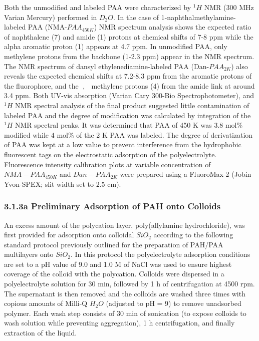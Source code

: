 \documentclass[journal=mamobx,manuscript=article]{achemso}
\begin{document}
Both the unmodified and labeled PAA were characterized by $^{1}H$ NMR (300 MHz Varian Mercury) performed in $D_2O$.  In the case of 1-naphthalmethylamine-labeled PAA (NMA-$PAA_{450K}$) NMR spectrum analysis shows the expected ratio of naphthalene (7) and amide (1) protons at chemical shifts of 7-8 ppm while the alpha aromatic proton (1) appears at 4.7 ppm.  In unmodified PAA, only methylene protons from the backbone (1-2.3 ppm) appear in the NMR spectrum.  The NMR spectrum of dansyl ethylenediamine-labeled PAA (Dan-$PAA_{2K}$) also reveals the expected chemical shifts at 7.2-8.3 ppm from the aromatic protons of the fluorophore, and the ,  methylene protons (4) from the amide link at around 3.4 ppm.  Both UV-vis absorption (Varian Cary 300-Bio Spectrophotometer), and $^{1}H$ NMR spectral analysis of the final product suggested little contamination of labeled PAA and the degree of modification was calculated by integration of the $^{1}H$ NMR spectral peaks.  It was determined that PAA of 450 K was 3.8 mol\% modified while 4 mol\% of the 2 K PAA was labeled.  The degree of derivatization of PAA was kept at a low value to prevent interference from the hydrophobic fluorescent tags on the electrostatic adsorption of the polyelectrolyte.  Fluorescence intensity calibration plots at variable concentration of $NMA-PAA_{450K}$ and $Dan-PAA_{2K}$ were prepared using a FluoroMax-2 (Jobin Yvon-SPEX; slit width set to 2.5 cm). 

\subsubsection{3.1.3a Preliminary Adsorption of PAH onto Colloids}

An excess amount of the polycation layer, poly(allylamine hydrochloride), was first provided for adsorption onto colloidal $SiO_2$ according to the following standard protocol previously outlined for the preparation of PAH/PAA multilayers onto $SiO_2$.\cite{Burke2003}  In this protocol the polyelectrolyte adsorption conditions are set to a pH value of 9.0 and 1.0 M of NaCl was used to ensure highest coverage of the colloid with the polycation.  Colloids were dispersed in a polyelectrolyte solution for 30 min, followed by 1 h of centrifugation at 4500 rpm.  The supernatant is then removed and the colloids are washed three times with copious amounts of Milli-Q $H_2O$ (adjusted to pH = 9) to remove unadsorbed polymer.  Each wash step consists of 30 min of sonication (to expose colloids to wash solution while preventing aggregation), 1 h centrifugation, and finally extraction of the liquid.  
\end{document}

